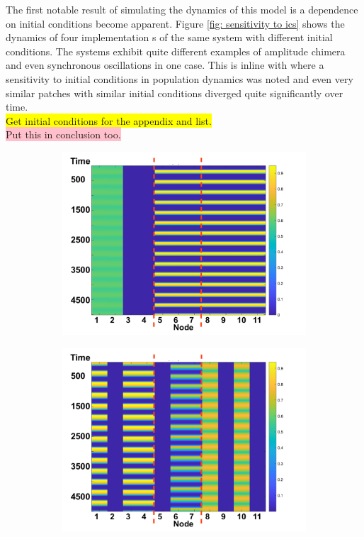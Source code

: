 \documentclass[12pt]{article}
\begin{document}
\noindent The first notable result of simulating the dynamics of this model is a dependence on initial conditions become apparent. Figure \ref{fig: sensitivity to ics} shows the dynamics of four implementation s of the same system with different initial conditions. The systems exhibit quite different examples of amplitude chimera and even synchronous oscillations in one case. This is inline with \cite{laurance2011} where a sensitivity to initial conditions in population dynamics was noted and even very similar patches with similar initial conditions diverged quite significantly over time.\\  \colorbox{yellow}{Get initial conditions for the appendix and list.} \\ \colorbox{pink}{Put this in conclusion too.}

\begin{figure}[H]
    \begin{subfigure}[b]{0.5\linewidth}
     \centering
     \includegraphics[width=\textwidth]{Claire Section/behavior_1.png}
     \end{subfigure}
     \begin{subfigure}[b]{0.5\linewidth}
     \centering
     \includegraphics[width=\textwidth]{Claire Section/behavior_2-2.png}

\end{subfigure}
\end{figure}
\end{document}
